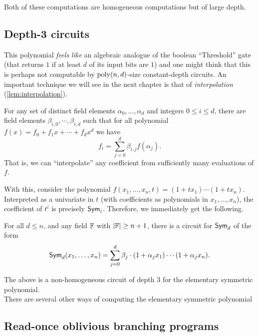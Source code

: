 Both of these computations are homogeneous computations but of large depth. 

\subsection{Depth-3 circuits}

This polynomial \emph{feels like} an algebraic analogue of the boolean ``Threshold'' gate (that returns $1$ if at least $d$ of its input bits are $1$) and one might think that this is perhaps not computable by $\operatorname{poly}(n,d)$-size constant-depth circuits. An important technique we will see in the next chapter is that of \emph{interpolation} (\autoref{lem:interpolation}). 

\begin{lemma} For any set of distinct field elements $\alpha_0, \ldots, \alpha_d$ and integers $0 \leq i \leq d$, there are field elements $\beta_{i,0}, \cdots, \beta_{i,d}$ such that for all polynomial $f(x) = f_0 + f_1 x + \cdots + f_d x^d$ we have
  \[
  f_i = \sum_{j=0}^d \beta_{i,j} f(\alpha_j).
  \]
  That is, we can ``interpolate'' any coefficient from sufficiently many evaluations of $f$. 
\end{lemma}

With this, consider the polynomial $f(x_1,\ldots, x_n, t) = (1 + tx_1) \cdots (1 + tx_n)$. Interpreted as a univariate in $t$ (with coefficients as polynomials in $x_1,\ldots, x_n$), the coefficient of $t^i$ is precisely $\operatorname{\mathsf{Sym}}_i$. Therefore, we immediately get the following. 

\begin{lemma}\label{lem:esym-benor-trick}
  For all $d \leq n$, and any field $\mathbb{F}$ with $|\mathbb{F}| \geq n+1$, there is a circuit for $\operatorname{\mathsf{Sym}}_d$ of the form
  \[
  \operatorname{\mathsf{Sym}}_d(x_1,\ldots, x_n) = \sum_{j=0}^d  \beta_{j} \cdot (1 + \alpha_j x_1) \cdots (1 + \alpha_j x_n).
  \]
\end{lemma}
The above is a non-homogeneous circuit of depth $3$ for the elementary symmetric polynomial. \\

There are several other ways of computing the elementary symmetric polynomial 

\subsection{Read-once oblivious branching programs}


